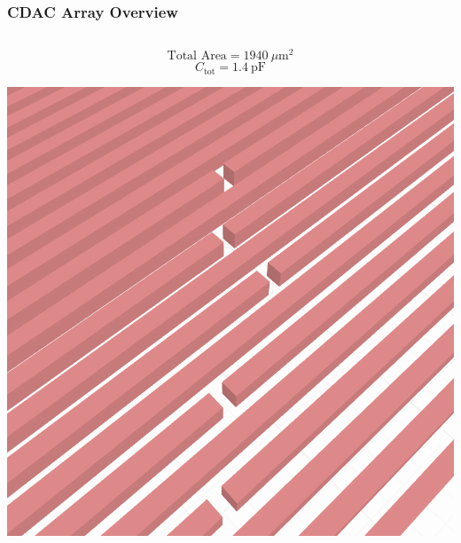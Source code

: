 \documentclass[aspectratio=169]{beamer}
\begin{document}
\begin{frame}
  \frametitle{CDAC Array Overview}

  \begin{columns}
    \begin{column}{0.5\textwidth}
      \[
        \text{Total Area} = 1940~\mu\mathrm{m}^2
      \]
      \[
        C_\mathrm{tot} = 1.4~\mathrm{pF}
      \]
      \begin{center}
        \includegraphics[width=\linewidth,height=0.5\textheight,keepaspectratio]{../images/cdac_array_3d.png}
      \end{center}
    \end{column}


\end{columns}
\end{frame}
\end{document}
